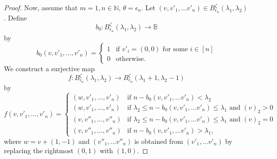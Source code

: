 \documentclass[12pt,reqno]{amsart}
\theoremstyle{definition}
\theoremstyle{remark}
\begin{document}
\begin{proof}
Now, assume that $m=1, n\in\mathbb{N}$, $\theta=\epsilon_n$. Let $(v,v'_{1},\dotsc v'_{n})\in B^{\zeta}_{\epsilon_{n}}(\lambda_{1},\lambda_{2})$.
Define $$b_{0}:B^{\zeta}_{\epsilon_{n}}(\lambda_{1},\lambda_{2})\xrightarrow[]{}\mathbb{B}$$ by
\begin{equation*}
b_{0}(v,v'_{1},\dotsc, v'_{n})=
\begin{cases}
    1 & \text{if }v'_{i}=(0,0)\text{ for some }i\in[n]\\
    0 & \text{otherwise.}
\end{cases}
\end{equation*}
We construct a surjective map $$f: B^{\zeta}_{\epsilon_{n}}(\lambda_{1},\lambda_{2})\xrightarrow{} B^{\zeta}_{\epsilon_{n}}(\lambda_{1}+1,\lambda_{2}-1)$$
by
\begin{equation*}
    f(v,v'_{1},\dotsc,v'_{n})=
    \begin{cases}
        (w,v'_{1},\dotsc,v'_{n}) & \text{if }n- b_{0}(v,v'_{1},\dotsc v'_{n})< \lambda_{2}\\
        (w,v'_{1},\dotsc,v'_{n}) & \text{if }\lambda_{2}\leq n- b_{0}(v,v'_{1},\dotsc v'_{n})\leq \lambda_{1}\text{ and }(v)_{2}>0\\
        (v,v''_{1},\dotsc,v''_{n}) & \text{if }\lambda_{2}\leq n- b_{0}(v,v'_{1},\dotsc v'_{n})\leq \lambda_{1}\text{ and }(v)_{2}=0\\
        (v,v''_{1},\dotsc,v''_{n}) & \text{if } n- b_{0}(v,v'_{1},\dotsc v'_{n})> \lambda_{1},
    \end{cases}
\end{equation*}
where $w=v+(1,-1)$ and $(v''_{1},\dotsc v''_{n})$ is obtained from $(v'_{1},\dotsc v'_{n})$ by replacing the rightmost $(0,1)$ with $(1,0)$. 

\end{proof}
\end{document}
